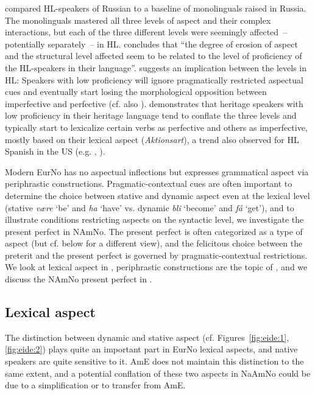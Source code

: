 \documentclass[output=paper]{langscibook}
\begin{document}
\citet{Laleko2010} compared HL-speakers of Russian to a baseline of monolinguals raised in Russia. The monolinguals mastered all three levels of aspect and their complex interactions, but each of the three different levels were seemingly affected~-- potentially separately~-- in HL. \citet[66]{Montrul2016} concludes that “the degree of erosion of aspect and the structural level affected seem to be related to the level of proficiency of the HL-speakers in their language”. \citet{Laleko2010} suggests an implication between the levels in HL: Speakers with low proficiency will ignore pragmatically restricted aspectual cues and eventually start losing the morphological opposition between imperfective and perfective (cf. also \citealt{Polinsky2006,Polinsky2008}). \citet{Polinsky2006} demonstrates that heritage speakers with low proficiency in their heritage language tend to conflate the three levels and typically start to lexicalize certain verbs as perfective and others as imperfective, mostly based on their lexical aspect (\textit{Aktionsart}), a trend also observed for HL Spanish in the US (e.g. \citealt{SilvaCorvalan1994}, \citealt{Montrul2002,Montrul2009}). 

Modern EurNo has no aspectual inflections but expresses grammatical aspect via periphrastic constructions. Pragmatic-contextual cues are often important to determine the choice between stative and dynamic aspect even at the lexical level (stative \textit{være} `be' and \textit{ha} ‘have’ vs. dynamic \textit{bli} ‘become’ and \textit{få} ‘get’), and to illustrate conditions restricting aspects on the syntactic level, we investigate the present perfect in NAmNo. The present perfect is often categorized as a type of aspect (but cf. below for a different view), and the felicitous choice between the preterit and the present perfect is governed by pragmatic-contextual restrictions. We look at lexical aspect in , periphrastic constructions are the topic of , and we discuss the NAmNo present perfect in . 

\subsection{Lexical aspect}
\label{sec:eide:4.1}

The distinction between dynamic and stative aspect (cf. Figures~\ref{fig:eide:1}, \ref{fig:eide:2}) plays quite an important part in EurNo lexical aspects, and native speakers are quite sensitive to it. AmE does not maintain this distinction to the same extent, and a potential conflation of these two aspects in NaAmNo could be due to a simplification or to transfer from AmE. 
\end{document}
